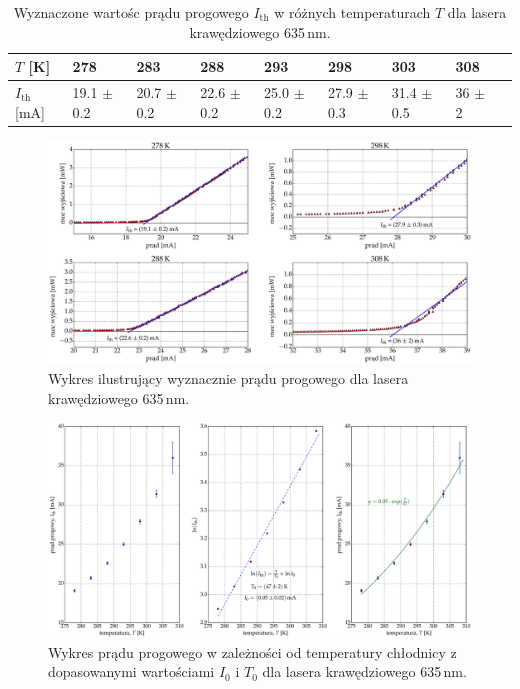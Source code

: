 \begin{table}[H]
\begin{center}
\caption{ Wyznaczone wartośc prądu progowego $I_{\mathrm{th}}$ w różnych temperaturach $T$ dla lasera krawędziowego 635\,nm. }
\begin{tabular}{ | C{1.5cm}|  C{1.5cm} | C{1.5cm} | C{1.5cm}| C{1.5cm} | C{1.5cm}| C{1.5cm}| C{2.0cm}| C{2.0cm}|}
\hline
$T$ [K] 	&   278 & 283  	& 288 & 293 & 298 & 303 & 308 \\ \hline
$I_{\mathrm{th}}$ [mA]  &	19.1 $\pm$ 0.2  & 20.7 $\pm$ 0.2 & 22.6 $\pm$ 0.2 &
25.0 $\pm$ 0.2  & 27.9 $\pm$ 0.3 & 31.4 $\pm$ 0.5 & 36 $\pm$ 2	\\ \hline
\end{tabular}
\label{tab:tabela_635}
\end{center}
\end{table}
\begin{figure}[H]
\center
  \includegraphics[scale=0.30]{plot635/plot_i_th_4.eps}
  \caption{Wykres ilustrujący wyznacznie prądu progowego dla lasera krawędziowego 635\,nm.}
  \label{fig:plot_i_th_4}
\end{figure}
\begin{figure}
\center
  \includegraphics[scale=0.30]{plot635/plot_fit.eps}
  \caption{Wykres prądu progowego w zależności od temperatury chłodnicy z dopasowanymi wartościami $I_{0}$ i $T_{0}$ dla lasera krawędziowego 635\,nm.}
  \label{fig:plot_fit}
\end{figure}
